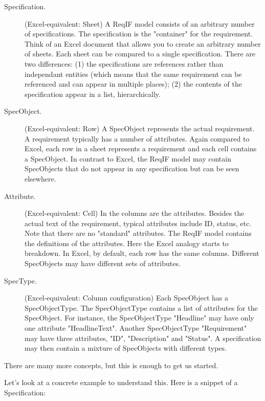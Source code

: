 \begin{description}
  \item[Specification.] (Excel-equivalent: Sheet) A ReqIF model consists of an arbitrary number of specifications.  The specification is the "container" for the requirement.  Think of an Excel document that allows you to create an arbitrary number of sheets.  Each sheet can be compared to a single specification.  There are two differences: (1) the specifications are references rather than independant entities (which means that the same requirement can be referenced and can appear in multiple places); (2) the contents of the specification appear in a list, hierarchically.

  \item[SpecObject.] (Excel-equivalent: Row) A SpecObject represents the actual requirement.  A requirement typically has a number of attributes.  Again compared to Excel, each row in a sheet represents a requirement and each cell contains a SpecObject.  In contrast to Excel, the ReqIF model may contain SpecObjects that do not appear in any specification but can be seen elsewhere.

  \item[Attribute.] (Excel-equivalent: Cell) In the columns are the attributes. Besides the actual text of the requirement, typical attributes include ID, status, etc.  Note that there are no "standard" attributes.  The ReqIF model contains the definitions of the attributes.  Here the Excel analogy starts to breakdown.  In Excel, by default, each row has the same columns.  Different SpecObjects may have different sets of attributes.

  \item[SpecType.] (Excel-equivalent: Column configuration) Each SpecObject has a SpecObjectType.  The SpecObjectType contains a list of attributes for the SpecObject.  For instance, the SpecObjectType "Headline" may have only one attribute "HeadlineText".  Another SpecObjectType "Requirement" may have three attributes, "ID", "Description" and "Status".  A specification may then contain a mixture of SpecObjects with different types.

\end{description}

There are many more concepts, but this is enough to get us started.

Let's look at a concrete example to understand this.  Here is a snippet of a Specification:

